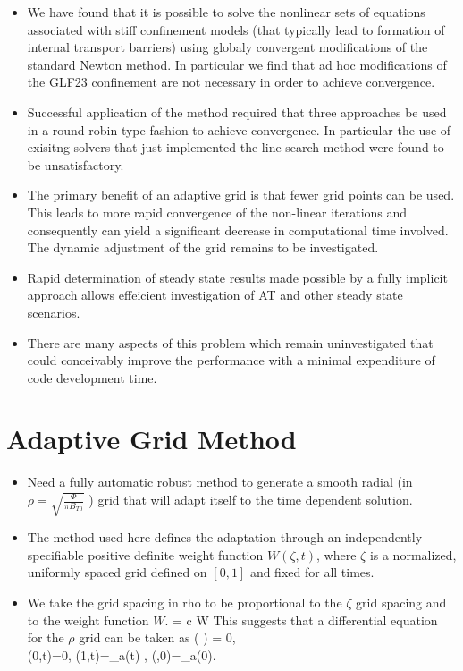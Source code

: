 \begin{itemize}
 \item  We have found that it is possible to solve the  nonlinear sets of
 equations associated with stiff confinement models (that typically lead to
 formation of internal transport barriers) using globaly convergent
 modifications of the standard Newton method. In particular we find that ad hoc
 modifications of the GLF23 confinement are not necessary in order to achieve
 convergence.
 \item Successful application of the method required that three approaches  be
 used in a round robin type fashion to achieve convergence. In particular the
 use of exisitng solvers that just implemented the line search method were found
 to be unsatisfactory.
 \item  The primary benefit of an  adaptive grid is that fewer grid points  can
 be used. This leads to more rapid convergence of the non-linear iterations and
 consequently can yield a significant decrease in computational time involved.
 The dynamic adjustment  of the grid remains to be investigated.
 \item Rapid determination of steady state results made  possible by a fully
 implicit approach allows effeicient investigation of AT and other steady state
 scenarios.
 \item There are many aspects of this
 problem which remain uninvestigated that could
 conceivably improve the performance with a
 minimal expenditure of code development time. 
\end{itemize}

\section{Adaptive Grid Method}

\begin{itemize} 
 \item Need a fully automatic robust method to generate a smooth radial (in $
 \rho = \sqrt{\frac{\Phi}{\pi B_{T0}}}$ ) grid that will adapt itself to the
 time dependent solution.
 \item   The method used here defines the adaptation through
 an independently specifiable positive definite
 weight function $ W(\zeta,t) $, where $\zeta$ is a
 normalized, uniformly spaced grid defined on $[0,1] $ 
 and fixed for all times.

 \item   We take the grid spacing in rho to be proportional to the $\zeta$ grid
 spacing  and to the weight function $ W $.
 \beq
  \Delta \rho = c W \Delta \zeta   \nonumber 
 \eeq
 This suggests that a differential equation for the $\rho $ grid can be taken as
 \beq
  \ddiff{\zeta}\left (\pdiff{\rho}{\zeta} 
  \right ) = 0, \\   \label{weq}
  \rho(0,t)=0, \rho(1,t)=\rho_a(t) ,
  \rho(\zeta,0)=\rho_a(0)\zeta  \nonumber.
 \eeq
\end{itemize}

